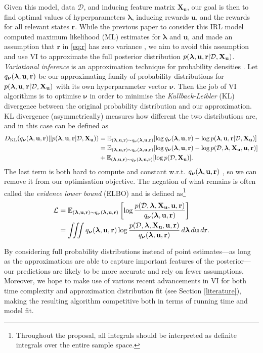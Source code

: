 \documentclass{mprop}
\theoremstyle{definition}
\begin{document}
Given this model, data $\mathcal{D}$, and inducing feature matrix
$\mathbf{X_u}$, our goal is then to find optimal values of hyperparameters
$\bm\lambda$, inducing rewards $\mathbf{u}$, and the rewards for all relevant
states $\mathbf{r}$. While the previous paper to consider this IRL model
computed maximum likelihood (ML) estimates for $\bm\lambda$ and $\mathbf{u}$,
and made an assumption that $\mathbf{r}$ in \eqref{eq:r} has zero variance
\cite{DBLP:conf/nips/LevinePK11}, we aim to avoid this assumption and use
VI to approximate the full posterior distribution $p(\bm\lambda, \mathbf{u}, \mathbf{r} | \mathcal{D}, \mathbf{X_u})$.
\emph{Variational inference} is an approximation technique for probability
densities \cite{blei2017variational}. Let $q_{\bm\nu}(\bm\lambda, \mathbf{u}, \mathbf{r})$ be our approximating
family of probability distributions for $p(\bm\lambda, \mathbf{u}, \mathbf{r} | \mathcal{D}, \mathbf{X_u})$ with its own hyperparameter
vector $\bm\nu$. Then the job of VI algorithms is to optimise $\bm\nu$ in order
to minimise the \emph{Kullback-Leibler} (KL) divergence between the original
probability distribution and our approximation.  KL divergence (asymmetrically)
measures how different the two distributions are, and in this case can be
defined as \cite{blei2017variational}
\[ \begin{split}
    D_{\mathrm{KL}}(q_{\bm\nu}(\bm\lambda, \mathbf{u}, \mathbf{r}) || p(\bm\lambda, \mathbf{u}, \mathbf{r} | \mathcal{D}, \mathbf{X_u})) &= \mathbb{E}_{(\bm\lambda, \mathbf{u}, \mathbf{r}) \sim q_{\bm\nu}(\bm\lambda, \mathbf{u}, \mathbf{r})} [\log q_{\bm\nu}(\bm\lambda, \mathbf{u}, \mathbf{r}) -
    \log p(\bm\lambda, \mathbf{u}, \mathbf{r} | \mathcal{D}, \mathbf{X_u}) ] \\
    &= \mathbb{E}_{(\bm\lambda, \mathbf{u}, \mathbf{r}) \sim q_{\bm\nu}(\bm\lambda, \mathbf{u}, \mathbf{r})}[\log q_{\bm\nu}(\bm\lambda, \mathbf{u}, \mathbf{r}) - \log p(\mathcal{D}, \bm\lambda, \mathbf{X_u}, \mathbf{u}, \mathbf{r})] \\
    &+ \mathbb{E}_{(\bm\lambda, \mathbf{u}, \mathbf{r}) \sim q_{\bm\nu}(\bm\lambda, \mathbf{u}, \mathbf{r})}[\log p(\mathcal{D}, \mathbf{X_u})].
  \end{split}
\]
The last term is both hard to compute and constant w.r.t. $q_{\bm\nu}(\bm\lambda, \mathbf{u}, \mathbf{r})$
\cite{blei2017variational}, so we can remove it from our optimisation objective.
The negation of what remains is often called the \emph{evidence lower bound}
(ELBO) and is defined as\footnote{Throughout the proposal, all integrals should
  be interpreted as definite integrals over the entire sample space.}
\cite{DBLP:books/lib/Bishop07,blei2017variational}
\begin{equation} \label{eq:elbo}
  \begin{split}
    \mathcal{L} &= \mathbb{E}_{(\bm\lambda, \mathbf{u}, \mathbf{r}) \sim q_{\bm\nu}(\bm\lambda, \mathbf{u}, \mathbf{r})} \left[ \log \frac{p(\mathcal{D}, \bm\lambda, \mathbf{X_u}, \mathbf{u}, \mathbf{r})}{q_{\bm\nu}(\bm\lambda, \mathbf{u}, \mathbf{r})}
    \right] \\
    &= \iiint q_{\bm\nu}(\bm\lambda, \mathbf{u}, \mathbf{r}) \log
    \frac{p(\mathcal{D}, \bm\lambda, \mathbf{X_u}, \mathbf{u}, \mathbf{r})}{q_{\bm\nu}(\bm\lambda, \mathbf{u}, \mathbf{r})}\,d\bm\lambda\,d\mathbf{u}\,d\mathbf{r}.
  \end{split}
\end{equation}

By considering full probability distributions instead of point estimates---as
long as the approximations are able to capture important features of the
posterior---our predictions are likely to be more accurate and rely on fewer
assumptions. Moreover, we hope to make use of various recent advancements in VI
for both time complexity and approximation distribution fit (see Section
\ref{literature}), making the resulting algorithm competitive both in terms of
running time and model fit.
\end{document}
